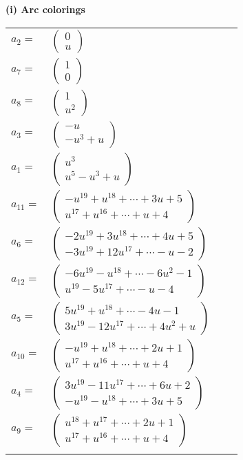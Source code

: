 \documentclass[1p]{elsarticle_modified}
\theoremstyle{definition}
\begin{document}
\flushleft \textbf{(i) Arc colorings}\\
\begin{tabular}{m{7pt} m{180pt} m{7pt} m{180pt} }
\flushright $a_{2}=$&$\begin{pmatrix}0\\u\end{pmatrix}$ \\
\flushright $a_{7}=$&$\begin{pmatrix}1\\0\end{pmatrix}$ \\
\flushright $a_{8}=$&$\begin{pmatrix}1\\u^2\end{pmatrix}$ \\
\flushright $a_{3}=$&$\begin{pmatrix}- u\\- u^3+u\end{pmatrix}$ \\
\flushright $a_{1}=$&$\begin{pmatrix}u^3\\u^5- u^3+u\end{pmatrix}$ \\
\flushright $a_{11}=$&$\begin{pmatrix}- u^{19}+u^{18}+\cdots+3 u+5\\u^{17}+u^{16}+\cdots+u+4\end{pmatrix}$ \\
\flushright $a_{6}=$&$\begin{pmatrix}-2 u^{19}+3 u^{18}+\cdots+4 u+5\\-3 u^{19}+12 u^{17}+\cdots- u-2\end{pmatrix}$ \\
\flushright $a_{12}=$&$\begin{pmatrix}-6 u^{19}- u^{18}+\cdots-6 u^2-1\\u^{19}-5 u^{17}+\cdots- u-4\end{pmatrix}$ \\
\flushright $a_{5}=$&$\begin{pmatrix}5 u^{19}+u^{18}+\cdots-4 u-1\\3 u^{19}-12 u^{17}+\cdots+4 u^2+u\end{pmatrix}$ \\
\flushright $a_{10}=$&$\begin{pmatrix}- u^{19}+u^{18}+\cdots+2 u+1\\u^{17}+u^{16}+\cdots+u+4\end{pmatrix}$ \\
\flushright $a_{4}=$&$\begin{pmatrix}3 u^{19}-11 u^{17}+\cdots+6 u+2\\- u^{19}- u^{18}+\cdots+3 u+5\end{pmatrix}$ \\
\flushright $a_{9}=$&$\begin{pmatrix}u^{18}+u^{17}+\cdots+2 u+1\\u^{17}+u^{16}+\cdots+u+4\end{pmatrix}$\\&\end{tabular}
\end{document}
